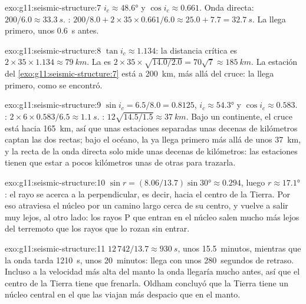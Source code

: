 \begin{solution}{exo:g11:seismic-structure:7}
$i_c \approx \ang{48.6}$ y $\cos i_c \approx 0.661$. Onda directa: $200/6.0
\approx \qty{33.3}{s}$. : $200/8.0 + 2 \times 35 \times 0.661/6.0
\approx 25.0 + 7.7 = \qty{32.7}{s}$. La  llega primero, unos
\qty{0.6}{s} antes.
\end{solution}

\begin{solution}{exo:g11:seismic-structure:8}
$\tan i_c \approx 1.134$: la distancia crítica es $2 \times 35 \times 1.134
\approx \qty{79}{km}$. La  es $2 \times 35 \times
\sqrt{14.0/2.0} = 70\sqrt 7 \approx \qty{185}{km}$. La estación del
\cref{exo:g11:seismic-structure:7} está a \qty{200}{km}, más allá del cruce:
la  llega primero, como se encontró.
\end{solution}

\begin{solution}{exo:g11:seismic-structure:9}
$\sin i_c = 6.5/8.0 = 0.8125$, $i_c \approx \ang{54.3}$ y $\cos i_c \approx
0.583$. : $2 \times 6 \times 0.583/6.5 \approx \qty{1.1}{s}$.
: $12\sqrt{14.5/1.5} \approx \qty{37}{km}$. Bajo un
continente, el cruce está hacia \qty{165}{km}, así que unas estaciones
separadas unas decenas de kilómetros captan las dos rectas; bajo el océano,
la  ya llega primero más allá de unos \qty{37}{km}, y la recta
de la onda directa solo mide unas decenas de kilómetros: las estaciones
tienen que estar a pocos kilómetros unas de otras para trazarla.
\end{solution}

\begin{solution}{exo:g11:seismic-structure:10}
$\sin r = (8.06/13.7)\sin\ang{30} \approx 0.294$, luego $r \approx \ang{17.1}$:
el rayo se acerca a la perpendicular, es decir, hacia el centro de la Tierra.
Por eso atraviesa el núcleo por un camino largo cerca de su centro, y vuelve
a salir muy lejos, al otro lado: los rayos P que entran en el núcleo salen
mucho más lejos del terremoto que los rayos que lo rozan sin entrar.
\end{solution}

\begin{solution}{exo:g11:seismic-structure:11}
$12\,742/13.7 \approx \qty{930}{s}$, unos 15.5~minutos, mientras que la onda
tarda \qty{1210}{s}, unos 20~minutos: llega con unos 280~segundos de retraso.
Incluso a la velocidad más alta del manto la onda llegaría mucho antes, así
que el centro de la Tierra tiene que frenarla. Oldham concluyó que la Tierra
tiene un núcleo central en el que las  viajan más despacio que en el
manto.
\end{solution}

